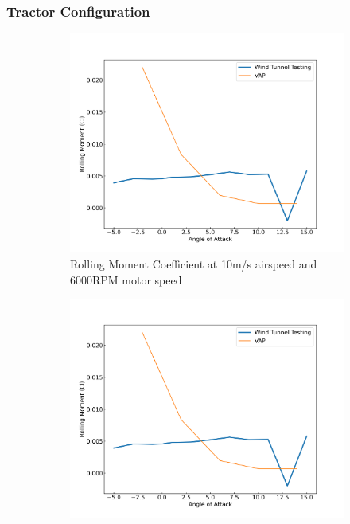 \subsubsection{Tractor Configuration}


\begin{figure}[H]
    \centering
    \begin{subfigure}[b]{0.467\textwidth}
        \centering
        \includegraphics[width=\textwidth]{05_Results/VAP/tractor/Cl/10ms_6000RPM_Cl.png}
        \caption{Rolling Moment Coefficient at 10m/s airspeed and 6000RPM motor speed}
        \label{fig:VAP_Cl_10ms_6000}
    \end{subfigure}
    \begin{subfigure}[b]{0.467\textwidth}
        \centering
        \includegraphics[width=\textwidth]{05_Results/VAP/tractor/Cl/10ms_6000RPM_Cl.png}

\end{subfigure}
\end{figure}
